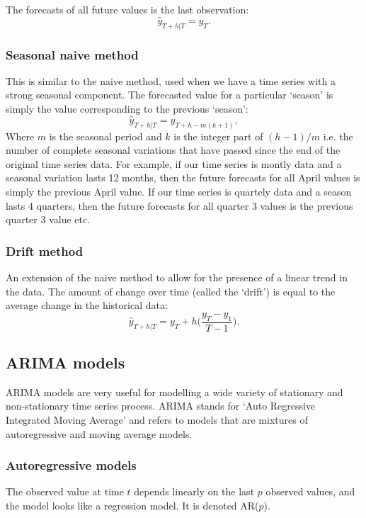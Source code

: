          The forecasts of all future values is the last observation: \[\hat{y}_{T+h|T} = y_{T}.\]

      \subsubsection{Seasonal naive method}

         This is similar to the naive method, used when we have a time series with a strong seasonal component. The forecasted value for a particular `season' is simply the value corresponding to the previous `season': \[\hat{y}_{T+h|T} = y_{T+h-m(k+1)},\]
         Where \(m\) is the seasonal period and \(k\) is the integer part of \((h-1)/m\) i.e. the number of complete seasonal variations that have passed since the end of the original time series data.
         For example, if our time series is montly data and a seasonal variation lasts 12 months, then the future forecasts for all April values is simply the previous April value. If our time series is quartely data and a season lasts 4 quarters, then the future forecasts for all quarter 3 values is the previous quarter 3 value etc.

      \subsubsection{Drift method}

         An extension of the naive method to allow for the presence of a linear trend in the data. The amount of change over time (called the `drift') is equal to the average change in the historical data: \[\hat{y}_{T+h|T} = y_{T} + h \Big(\frac{y_{T} - y_{1}}{T-1} \Big).\]

   \subsection{ARIMA models}

      ARIMA models are very useful for modelling a wide variety of stationary and non-stationary time series process. ARIMA stands for `Auto Regressive Integrated Moving Average' and refers to models that are mixtures of autoregressive and moving average models.

      \subsubsection{Autoregressive models}

         The observed value at time \(t\) depends linearly on the last \(p\) observed values, and the model looks like a regression model. It is denoted AR(\(p\)).

